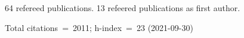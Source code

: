 64 refereed publications. 13 refeered publications as first author.

Total citations~=~2011; h-index~=~23 (2021-09-30)